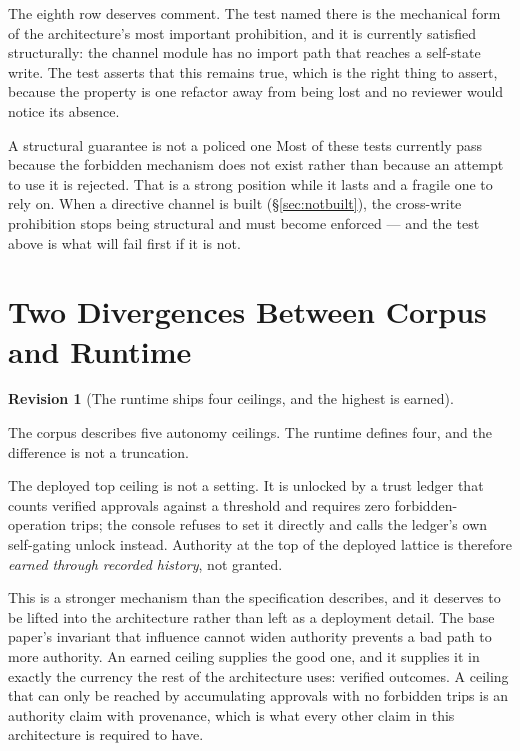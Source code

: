 \documentclass[11pt]{article}
\newtheorem{revision}{Revision}
\begin{document}
The eighth row deserves comment. The test named there is the mechanical form of the architecture's most important prohibition, and it is currently satisfied structurally: the channel module has no import path that reaches a self-state write. The test asserts that this remains true, which is the right thing to assert, because the property is one refactor away from being lost and no reviewer would notice its absence.

\begin{cautionbox}{A structural guarantee is not a policed one}
Most of these tests currently pass because the forbidden mechanism does not exist rather than because an attempt to use it is rejected. That is a strong position while it lasts and a fragile one to rely on. When a directive channel is built (\S\ref{sec:notbuilt}), the cross-write prohibition stops being structural and must become enforced --- and the test above is what will fail first if it is not.
\end{cautionbox}

\section{Two Divergences Between Corpus and Runtime}
\label{sec:divergences}

\begin{revision}[The runtime ships four ceilings, and the highest is earned]
\label{rev:ceilings}
\end{revision}

\noindent The corpus describes five autonomy ceilings. The runtime defines four, and the difference is not a truncation.

The deployed top ceiling is not a setting. It is unlocked by a trust ledger that counts verified approvals against a threshold and requires zero forbidden-operation trips; the console refuses to set it directly and calls the ledger's own self-gating unlock instead. Authority at the top of the deployed lattice is therefore \emph{earned through recorded history}, not granted.

This is a stronger mechanism than the specification describes, and it deserves to be lifted into the architecture rather than left as a deployment detail. The base paper's invariant that influence cannot widen authority prevents a bad path to more authority. An earned ceiling supplies the good one, and it supplies it in exactly the currency the rest of the architecture uses: verified outcomes. A ceiling that can only be reached by accumulating approvals with no forbidden trips is an authority claim with provenance, which is what every other claim in this architecture is required to have.
\end{document}
